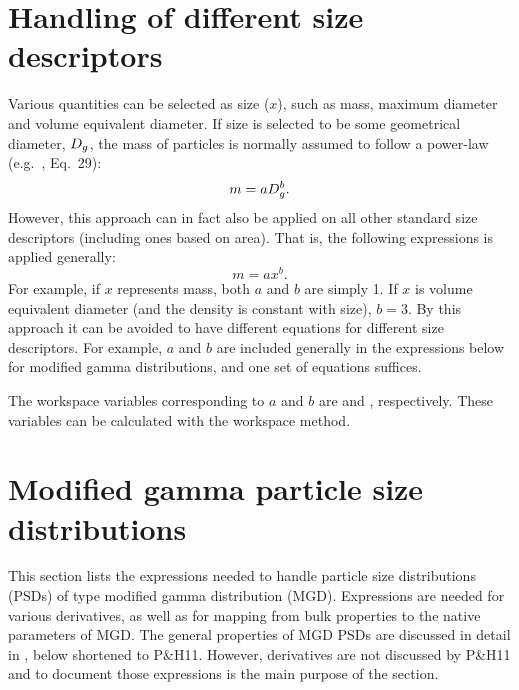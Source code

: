 \section{Handling of different size descriptors}
\label{sec:psd:size}
%
Various quantities can be selected as size ($x$), such as mass, maximum
diameter and volume equivalent diameter. If size is selected to be some
geometrical diameter, $D_g$, the mass of particles is normally assumed to
follow a power-law (e.g.\ \citet{petty2011modified}, Eq.~29):
\begin{displaymath}
  m = a D_g^b.  
\end{displaymath}
However, this approach can in fact also be applied on all other standard size
descriptors (including ones based on area). That is, the following expressions is
applied generally:
\begin{equation}
  m = a x^b.  
\end{equation}
For example, if $x$ represents mass, both $a$ and $b$ are simply 1. If $x$ is
volume equivalent diameter (and the density is constant with size), $b=3$. By
this approach it can be avoided to have different equations for different size
descriptors. For example, $a$ and $b$ are included generally in the expressions
below for modified gamma distributions, and one set of equations suffices.

The workspace variables corresponding to $a$ and $b$ are
 and , respectively.
These variables can be calculated with the 
workspace method.


\section{Modified gamma particle size distributions}
%
This section lists the expressions needed to handle particle size distributions
(PSDs) of type modified gamma distribution (MGD). Expressions are needed for
various derivatives, as well as for mapping from bulk properties to the native
parameters of MGD. The general properties of MGD PSDs are discussed in detail
in \citet{petty2011modified}, below shortened to P\&H11. However, derivatives
are not discussed by P\&H11 and to document those expressions is the main
purpose of the section.

